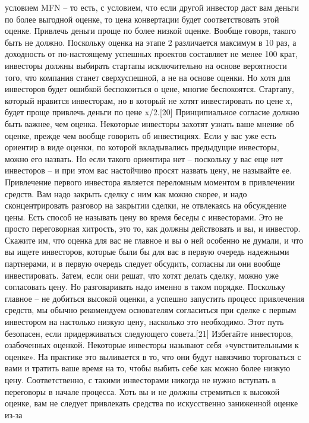\documentclass[ebook,12pt,oneside,openany]{memoir}
\begin{document}
условием MFN – то есть, с условием, что если другой инвестор даст вам
деньги по более выгодной оценке, то цена конвертации будет
соответствовать этой оценке. Привлечь деньги проще по более низкой
оценке. Вообще говоря, такого быть не должно. Поскольку оценка на
этапе 2 различается максимум в 10 раз, а доходность от по-настоящему
успешных проектов составляет не менее 100 крат, инвесторы должны
выбирать стартапы исключительно на основе вероятности того, что
компания станет сверхуспешной, а не на основе оценки. Но хотя для
инвесторов будет ошибкой беспокоиться о цене, многие беспокоятся.
Стартапу, который нравится инвесторам, но в который не хотят
инвестировать по цене x, будет проще привлечь деньги по цене x/2.[20]
Принципиальное согласие должно быть важнее, чем оценка. Некоторые
инвесторы захотят узнать ваше мнение об оценке, прежде чем вообще
говорить об инвестициях. Если у вас уже есть ориентир в виде оценки,
по которой вкладывались предыдущие инвесторы, можно его назвать. Но
если такого ориентира нет – поскольку у вас еще нет инвесторов – и при
этом вас настойчиво просят назвать цену, не называйте ее. Привлечение
первого инвестора является переломным моментом в привлечении средств.
Вам надо закрыть сделку с ним как можно скорее, и надо
сконцентрировать разговор на закрытии сделки, не отвлекаясь на
обсуждение цены. Есть способ не называть цену во время беседы с
инвесторами. Это не просто переговорная хитрость, это то, как должны
действовать и вы, и инвестор. Скажите им, что оценка для вас не
главное и вы о ней особенно не думали, и что вы ищете инвесторов,
которые были бы для вас в первую очередь надежными партнерами, и в
первую очередь следует обсудить, согласны ли они вообще инвестировать.
Затем, если они решат, что хотят делать сделку, можно уже согласовать
цену. Но разговаривать надо именно в таком порядке. Поскольку главное
– не добиться высокой оценки, а успешно запустить процесс привлечения
средств, мы обычно рекомендуем основателям согласиться при сделке с
первым инвестором на настолько низкую цену, насколько это необходимо.
Этот путь безопасен, если придерживаться следующего совета.[21]
Избегайте инвесторов, озабоченных оценкой. Некоторые инвесторы
называют себя «чувствительными к оценке». На практике это выливается в
то, что они будут навязчиво торговаться с вами и тратить ваше время на
то, чтобы выбить себе как можно более низкую цену. Соответственно, с
такими инвесторами никогда не нужно вступать в переговоры в начале
процесса. Хоть вы и не должны стремиться к высокой оценке, вам не
следует привлекать средства по искусственно заниженной оценке из-за
\end{document}
